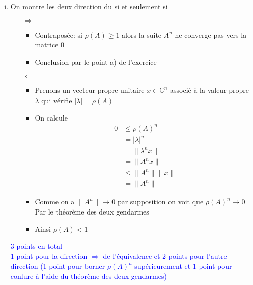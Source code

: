 \documentclass[11pt, a4paper, oneside]{article}
\newcommand{\indice}[1]{{\scriptsize \color{RubineRed} {#1}}}
\begin{document}
\begin{enumerate}[i)]
\item 
\indice{On montre les deux direction du si et seulement si}
\begin{itemize}
    \item [$\Longrightarrow$] 
    \begin{itemize}
    \item Contraposée: si $\rho(A) \geq 1$ alors la suite $A^n$ ne converge pas vers la matrice 0
    \item Conclusion par le point a) de l'exercice 
    \end{itemize}
    \item [$\Longleftarrow$] 
    \begin{itemize}
    \item Prenons un vecteur propre unitaire $x \in \mathbb{C}^n$ associé à la valeur propre $\lambda$ qui vérifie $|\lambda| = \rho(A)$
    \item On calcule
    \begin{align*}
        0 &\leq \rho(A)^n \\
        &= |\lambda|^n \\
        &= \lVert \lambda^nx \rVert \\
        &= \lVert A^nx \rVert \\
        &\leq \lVert A^n \rVert \lVert x \rVert \\
        &= \lVert A^n \rVert
    \end{align*}
    \item Comme on a $\lVert A^n \rVert \rightarrow 0$ par supposition on voit que $\rho(A)^n \rightarrow 0$ \\
    \indice{Par le théorème des deux gendarmes}
    \item Ainsi $\rho(A)<1$ \\
    \end{itemize}
\end{itemize}
\textcolor{blue}{3 points en total \\ 1 point pour la direction $\Longrightarrow$ de l'équivalence et 2 points pour l'autre direction (1 point pour borner $\rho(A)^n$ supérieurement et 1 point pour conlure à l'aide du théorème des deux gendarmes)} 

\end{enumerate}
\end{document}
